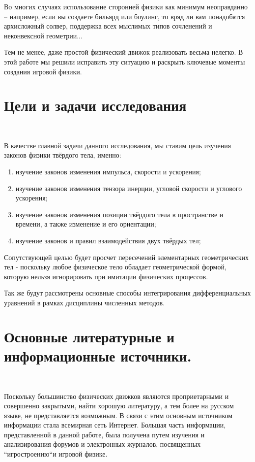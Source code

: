 Во многих случаях использование сторонней
физики как минимум неоправданно – например, если вы
создаете бильярд или боулинг, то вряд ли вам понадобятся
архисложный солвер, поддержка всех мыслимых типов
сочленений и неконвексной геометрии...%

Тем не менее, даже простой физический движок
реализовать весьма нелегко. В этой работе мы решили исправить эту
ситуацию и раскрыть ключевые моменты создания игровой физики.

\section{Цели и задачи исследования} 
\

В качестве главной задачи данного исследования, мы ставим цель
изучения законов физики твёрдого тела,  именно:

\begin{enumerate}
\item изучение законов изменения импульса, скорости и ускорения; \\
\item изучение законов изменения тензора инерции, угловой скорости
и углового ускорения; \\ 
\item изучение законов изменения позиции твёрдого тела в пространстве
и времени, а также изменение и его ориентации; \\
\item изучение законов и правил взаимодействия двух твёрдых тел; \\
\end{enumerate}

Сопутствующей целью будет просчет пересечений элементарных 
геометрических тел - поскольку любое физическое тело обладает
геометрической формой, которую нельзя игнорировать при имитации 
физических процессов.

Так же будут рассмотрены основные способы интегрирования
дифференциальных уравнений в рамках дисциплины численных методов.

\section{Основные литературные и информационные источники.}
\

Поскольку большинство физических движков являются проприетарными
и совершенно закрытыми, найти хорошую литературу, а тем более
на русском языке, не представляется возможным. В связи с этим основным
источником информации стала всемирная сеть Интернет. Большая часть 
информации, представленной в данной работе, была получена путем изучения
и анализирования форумов и электронных журналов, посвященных
``игростроению``и игровой физике.

